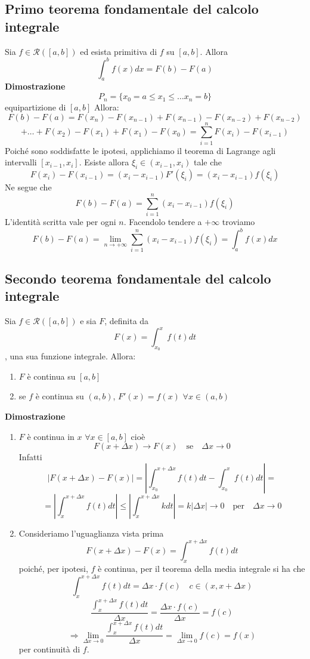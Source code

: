 \documentclass[12pt]{article}
\begin{document}
\subsection{Primo teorema fondamentale del calcolo integrale}
Sia $f \in \mathscr{R} ([a,b])$ ed esista primitiva di $f$ su $[a,b]$. Allora 
\[\int_{a}^{b} f(x) dx = F(b) - F(a)\]
\textbf{Dimostrazione}
\[ P_n = \{ x_0 = a \leq x_1 \leq \dots x_n = b \} \] equipartizione di $[a,b]$ Allora:
\[ F(b) - F(a) = F(x_n) - F(x_{n-1}) + F(x_{n-1}) - F(x_{n-2}) + F(x_{n-2})\]
\[+ \dots + F(x_2) - F(x_1) + F(x_1) - F(x_0) = \sum_{i = 1}^{n} F(x_i) - F(x_{i-1})\]
Poiché sono soddisfatte le ipotesi, applichiamo il teorema di Lagrange agli intervalli $[x_{i-1}, x_i]$. Esiste allora $\xi_i \in (x_{i-1}, x_i)$ tale che
\[ F(x_i) - F(x_{i-1}) = (x_i - x_{i-1})F'(\xi_i) = (x_i - x_{i-1})f(\xi_i)\]
Ne segue che
\[F(b) - F(a) = \sum_{i = 1}^{n} (x_i - x_{i-1})f(\xi_i) \]
L'identità scritta vale per ogni $n$. Facendolo tendere a $+\infty$ troviamo
\[\displaystyle F(b) - F(a) = \lim_{n \to +\infty} \sum_{i = 1}^{n} (x_i - x_{i-1})f(\xi_i) = \int_{a}^{b} f(x) dx\]

\subsection{Secondo teorema fondamentale del calcolo integrale}
Sia $f \in \mathscr{R}([a,b])$ e sia $F$, definita da 
\[F(x) = \int_{x_0}^x f(t) dt\]
, una sua funzione integrale. Allora:
\begin{enumerate}
  \item $F$ è continua su $[a,b]$
  \item se $f$ è continua su $(a,b)$, $F'(x) = f(x)$ $\forall x \in (a,b)$
\end{enumerate}
\textbf{Dimostrazione}
\begin{enumerate}
    \item 
    $F$ è continua in $x$ $\forall x \in [a,b]$ cioè
\[F(x + \Delta x) \to F(x) \quad \text{se} \quad \Delta x \to 0\] Infatti
\[|F(x + \Delta x) - F(x)| = |\int_{x_0}^{x + \Delta x} f(t) dt - \int_{x_0}^{x} f(t) dt| = \]
\[ = |\int_{x}^{x+\Delta x} f(t) dt| \leq |\int_{x}^{x+\Delta x} k dt| = k|\Delta x| \to 0 \quad \text{per} \quad \Delta x \to 0\]
    \item
    Consideriamo l'uguaglianza vista prima
\[F(x + \Delta x) - F(x) = \int_{x}^{x+\Delta x} f(t) dt\]
poiché, per ipotesi, $f$ è continua, per il teorema della media integrale si ha che
\[ \int_{x}^{x+\Delta x} f(t) dt = \Delta x \cdot f(c) \quad c \in (x, x+\Delta x)\]
\[\frac{\int_{x}^{x+\Delta x} f(t) dt}{\Delta x} = \frac{\Delta x \cdot f(c)}{\Delta x} = f(c)\]
\[ \Rightarrow \lim_{\Delta x \to 0} \frac{\int_{x}^{x+\Delta x} f(t) dt}{\Delta x} = \lim_{\Delta x \to 0} f(c) = f(x) \]
per continuità di $f$.
\end{enumerate}
\end{document}
